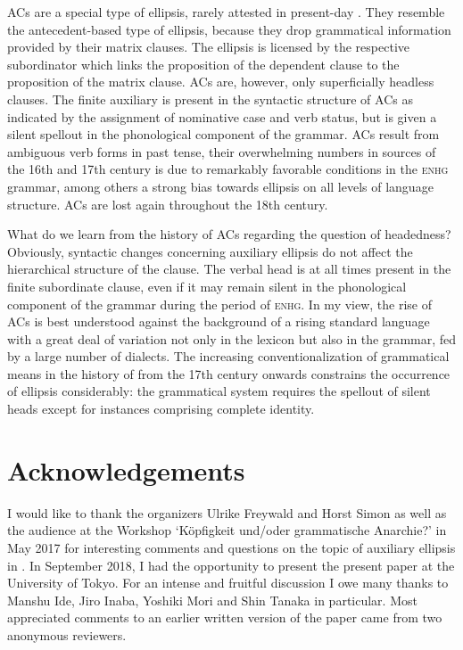 \documentclass[output=paper,colorlinks,citecolor=brown]{langscibook}
\begin{document}
ACs are a special type of ellipsis, rarely attested in present-day . They resemble the antecedent-based type of ellipsis, because they drop grammatical information provided by their matrix clauses. The ellipsis is licensed by the respective subordinator which links the proposition of the dependent clause to the proposition of the matrix clause. ACs are, however, only superficially headless clauses. The finite auxiliary is present in the syntactic structure of ACs as indicated by the assignment of nominative case and verb status, but is given a silent spellout in the phonological component of the grammar. ACs result from ambiguous verb forms in past tense, their overwhelming numbers in sources of the 16th and 17th century is due to remarkably favorable conditions in the \textsc{enhg} grammar, among others a strong bias towards ellipsis on all levels of language structure. ACs are lost again throughout the 18th century. 

What do we learn from the history of ACs regarding the question of headedness? Obviously, syntactic changes concerning auxiliary ellipsis do not affect the hierarchical structure of the clause. The verbal head is at all times present in the finite subordinate clause, even if it may remain silent in the phonological component of the grammar during the period of \textsc{enhg}. In my view, the rise of ACs is best understood against the background of a rising standard language with a great deal of variation not only in the lexicon but also in the grammar, fed by a large number of dialects. The increasing conventionalization of grammatical means in the history of  from the 17th century onwards constrains the occurrence of ellipsis considerably: the grammatical system requires the spellout of silent heads except for instances comprising complete identity. 

\section*{Acknowledgements}

I would like to thank the organizers Ulrike Freywald and Horst Simon as well as the audience at the Workshop `Köpfigkeit und/oder grammatische Anarchie?' in May 2017 for interesting comments and questions on the topic of auxiliary ellipsis in . In September 2018, I had the opportunity to present the present paper at the University of Tokyo. For an intense and fruitful discussion I owe many thanks to Manshu Ide, Jiro Inaba, Yoshiki Mori and Shin Tanaka in particular. Most appreciated comments to an earlier written version of the paper came from two anonymous reviewers.
\end{document}

